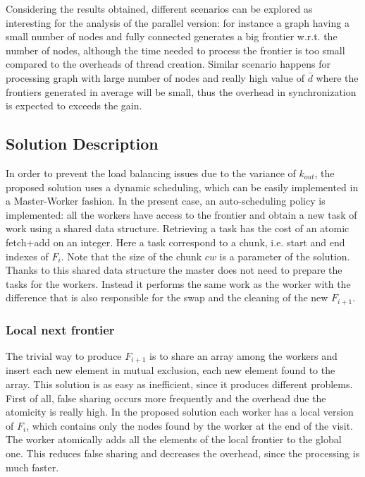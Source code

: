 Considering the results obtained, different scenarios can be explored as interesting for the analysis of the parallel version: for instance a graph having a small number of nodes and fully connected generates a big frontier w.r.t. the number of nodes, although the time needed to process the frontier is too small compared to the overheads of thread creation. Similar scenario happens for processing graph with large number of nodes and really high value of $\bar{d}$ where the frontiers generated in average will be small, thus the overhead in synchronization is expected to exceeds the gain.

\subsection{Solution Description}
In order to prevent the load balancing issues 
due to the variance of $k_{out}$, the proposed solution
uses a dynamic scheduling, which can be easily implemented
in a Master-Worker fashion. In the
present case, an auto-scheduling policy is implemented:  all the workers have access to the frontier
and obtain a new task of work using a shared
data structure. Retrieving a task has the cost of an
atomic fetch+add on an integer. Here a task correspond to a chunk, i.e.
 start and end indexes of $F_i$. Note that the size of the chunk $cw$
 is a parameter of the solution. Thanks to this shared data structure
 the master does not need to
 prepare the tasks for the workers. Instead it performs the same work as 
 the worker with the difference that is also responsible for 
 the swap and the cleaning of the new $F_{i+1}$. 
\subsubsection{Local next frontier}
The trivial way to produce $F_{i+1}$ is to share an array among the workers and insert each new element in mutual exclusion, each new element found to the array. This solution is as easy as inefficient, since it produces different problems. First of all, false sharing occurs more frequently and the overhead due the atomicity is really high. In the proposed solution each worker has a local version of $F_i$, which contains only the nodes found by the worker at the end of the visit. The worker atomically adds all the elements of the local frontier to the global one. This reduces false sharing and decreases the overhead, since the processing is much faster.  
